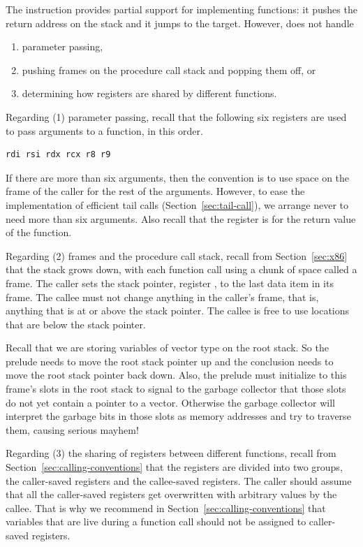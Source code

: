 \documentclass[11pt]{book}
\begin{document}

The  instruction provides partial support for implementing
functions: it pushes the return address on the stack and it jumps to
the target. However,  does not handle
\begin{enumerate}
\item parameter passing,
\item pushing frames on the procedure call stack and popping them off,
  or
\item determining how registers are shared by different functions.
\end{enumerate}

Regarding (1) parameter passing, recall that the following six
registers are used to pass arguments to a function, in this order.
\begin{lstlisting}
rdi rsi rdx rcx r8 r9
\end{lstlisting}
If there are
more than six arguments, then the convention is to use space on the
frame of the caller for the rest of the arguments. However, to ease
the implementation of efficient tail calls
(Section~\ref{sec:tail-call}), we arrange never to need more than six
arguments.
%
Also recall that the register  is for the return value of
the function.


Regarding (2) frames  and the procedure call stack,
 recall from Section~\ref{sec:x86} that
the stack grows down, with each function call using a chunk of space
called a frame. The caller sets the stack pointer, register
, to the last data item in its frame. The callee must not
change anything in the caller's frame, that is, anything that is at or
above the stack pointer. The callee is free to use locations that are
below the stack pointer.

Recall that we are storing variables of vector type on the root stack.
So the prelude needs to move the root stack pointer  up and
the conclusion needs to move the root stack pointer back down.  Also,
the prelude must initialize to  this frame's slots in the root
stack to signal to the garbage collector that those slots do not yet
contain a pointer to a vector. Otherwise the garbage collector will
interpret the garbage bits in those slots as memory addresses and try
to traverse them, causing serious mayhem!

Regarding (3) the sharing of registers between different functions,
recall from Section~\ref{sec:calling-conventions} that the registers
are divided into two groups, the caller-saved registers and the
callee-saved registers. The caller should assume that all the
caller-saved registers get overwritten with arbitrary values by the
callee. That is why we recommend in
Section~\ref{sec:calling-conventions} that variables that are live
during a function call should not be assigned to caller-saved
registers.
\end{document}
